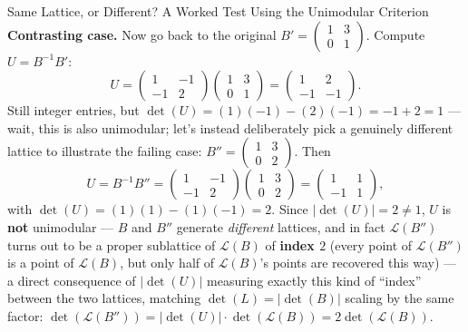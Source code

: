 \begin{exbox}{Same Lattice, or Different? A Worked Test Using the Unimodular Criterion}
\textbf{Contrasting case.} Now go back to the original $B' = \begin{pmatrix} 1 & 3 \\ 0 & 1 \end{pmatrix}$. Compute $U = B^{-1}B'$:
$$
U = \begin{pmatrix} 1 & -1 \\ -1 & 2\end{pmatrix}\begin{pmatrix} 1 & 3 \\ 0 & 1\end{pmatrix} = \begin{pmatrix} 1 & 2 \\ -1 & -1 \end{pmatrix}.
$$
Still integer entries, but $\det(U) = (1)(-1) - (2)(-1) = -1+2 = 1$ --- wait, this is also unimodular; let's instead deliberately pick a genuinely different lattice to illustrate the failing case: $B'' = \begin{pmatrix} 1 & 3 \\ 0 & 2 \end{pmatrix}$. Then
$$
U = B^{-1}B'' = \begin{pmatrix} 1 & -1 \\ -1 & 2\end{pmatrix}\begin{pmatrix} 1 & 3 \\ 0 & 2\end{pmatrix} = \begin{pmatrix} 1 & 1 \\ -1 & 1 \end{pmatrix},
$$
with $\det(U) = (1)(1)-(1)(-1) = 2$. Since $|\det(U)| = 2 \ne 1$, $U$ is \textbf{not} unimodular --- $B$ and $B''$ generate \emph{different} lattices, and in fact $\mathcal{L}(B'')$ turns out to be a proper sublattice of $\mathcal{L}(B)$ of \textbf{index $2$} (every point of $\mathcal{L}(B'')$ is a point of $\mathcal{L}(B)$, but only half of $\mathcal{L}(B)$'s points are recovered this way) --- a direct consequence of $|\det(U)|$ measuring exactly this kind of ``index'' between the two lattices, matching $\det(L) = |\det(B)|$ scaling by the same factor: $\det(\mathcal{L}(B'')) = |\det(U)|\cdot\det(\mathcal{L}(B)) = 2\det(\mathcal{L}(B))$.
\end{exbox}

